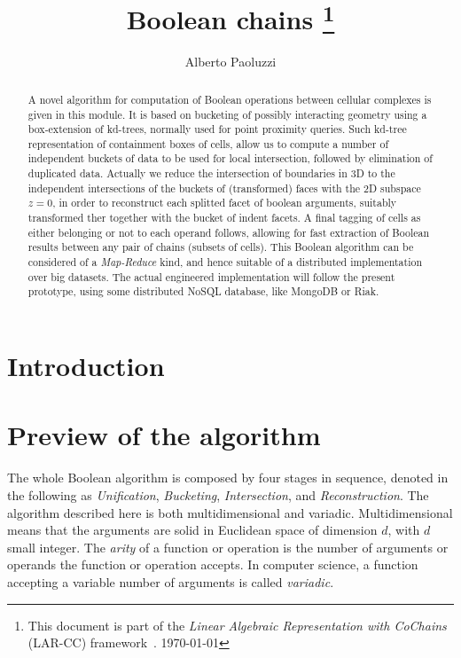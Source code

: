 \documentclass[11pt,oneside]{article}    %
\title{Boolean chains
\footnote{This document is part of the \emph{Linear Algebraic Representation with CoChains} (LAR-CC) framework~\cite{cclar-proj:2013:00}. \today}
}
\author{Alberto Paoluzzi}
\begin{document}
\maketitle
\nonstopmode

\begin{abstract}
A novel algorithm for computation of Boolean operations between cellular complexes is given in this module.
It is based on bucketing of possibly interacting geometry using a box-extension of kd-trees, normally used for  point proximity queries. 
Such kd-tree representation of containment boxes of cells, allow us to compute a number of independent buckets of data to be used for local intersection, followed by elimination of duplicated data.
Actually we reduce the intersection of boundaries in 3D to the independent intersections of the buckets of (transformed) faces with the 2D subspace $z=0$, in order to reconstruct each splitted facet of boolean arguments, suitably transformed ther together with the bucket of indent facets.
A final tagging of cells as either belonging or not to each operand follows, allowing for fast extraction of Boolean results between any pair of chains (subsets of cells).
This Boolean algorithm can be considered of a \emph{Map-Reduce} kind, and hence suitable of a distributed implementation over big datasets. The actual engineered implementation will follow the present prototype, using some distributed NoSQL database, like MongoDB or Riak. 
\end{abstract}

\tableofcontents

\section{Introduction}


\section{Preview of the algorithm}

The whole Boolean algorithm is composed by four stages in sequence, denoted in the following as \emph{Unification}, \emph{Bucketing}, \emph{Intersection}, and \emph{Reconstruction}. The algorithm described here is both multidimensional and variadic. Multidimensional means that the arguments are solid in Euclidean space of dimension $d$, with $d$ small integer.
The \emph{arity}  of a function or operation is the number of arguments or operands the function or operation accepts. 
In computer science, a function accepting a variable number of arguments is called \emph{variadic}.
\end{document}
